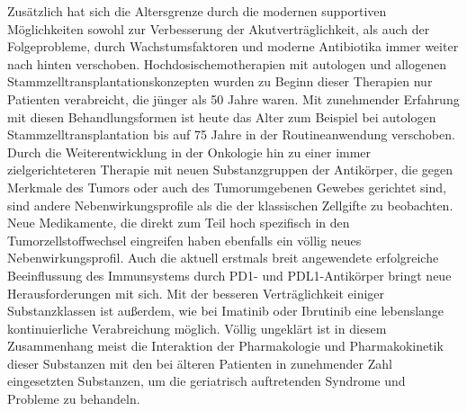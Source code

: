 Zusätzlich hat sich die Altersgrenze durch die modernen supportiven Möglichkeiten sowohl zur Verbesserung der Akutverträglichkeit, als auch der Folgeprobleme, durch Wachstumsfaktoren und moderne Antibiotika immer weiter nach hinten verschoben. Hochdosischemotherapien mit autologen und allogenen Stammzelltransplantationskonzepten wurden zu Beginn dieser Therapien nur Patienten verabreicht, die jünger als 50 Jahre waren. Mit zunehmender Erfahrung mit diesen Behandlungsformen ist heute das Alter zum Beispiel bei autologen Stammzelltransplantation bis auf 75 Jahre in der Routineanwendung verschoben.
Durch die Weiterentwicklung in der Onkologie hin zu einer immer zielgerichteteren Therapie mit neuen Substanzgruppen der Antikörper, die gegen Merkmale des Tumors oder auch des Tumorumgebenen Gewebes gerichtet sind, sind andere Nebenwirkungsprofile als die der klassischen Zellgifte zu beobachten. Neue Medikamente, die direkt zum Teil hoch spezifisch in den Tumorzellstoffwechsel eingreifen haben ebenfalls ein völlig neues Nebenwirkungsprofil. Auch die aktuell erstmals breit angewendete erfolgreiche Beeinflussung des Immunsystems durch PD1- und PDL1-Antikörper bringt neue Herausforderungen mit sich.
Mit der besseren Verträglichkeit einiger Substanzklassen ist außerdem, wie bei Imatinib oder Ibrutinib eine lebenslange kontinuierliche Verabreichung möglich. Völlig ungeklärt ist in diesem Zusammenhang meist die Interaktion der Pharmakologie und Pharmakokinetik dieser Substanzen mit den bei älteren Patienten in zunehmender Zahl eingesetzten Substanzen, um die geriatrisch auftretenden Syndrome und Probleme zu behandeln.

